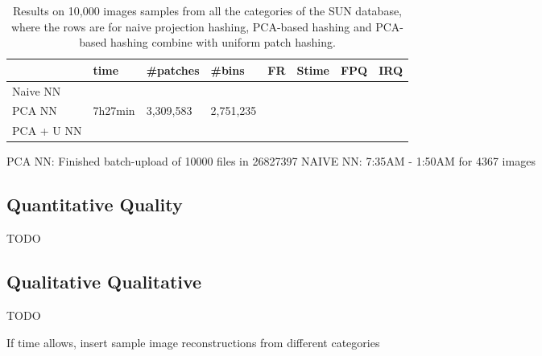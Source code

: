 \begin{table*}
\begin{tabular}{ | l | l | l | l | l | l | l | l | }
\hline
& time & \#patches & \#bins & FR & Stime & FPQ & IRQ \\
\hline
Naive NN & & & & & & & \\
PCA NN & 7h27min & 3,309,583 & 2,751,235 & & & &  \\
PCA + U NN & & & & & & &\\
\hline
\end{tabular}
\caption{Results on 10,000 images samples from all
the categories of the SUN database, where the rows
are for naive projection hashing, PCA-based hashing and
PCA-based hashing combine with uniform patch hashing.}
\label{tb:nn-res}
\end{table*}

PCA NN: Finished batch-upload of 10000 files in 26827397
NAIVE NN: 7:35AM - 1:50AM for 4367 images



\subsection{Quantitative Quality}\label{ssec:quant}
\begin{edit}
TODO
\end{edit}


\subsection{Qualitative Qualitative}\label{ssec:qual}
\begin{edit}
TODO
\end{edit}

\begin{edit}
If time allows, insert sample image reconstructions from different categories
\end{edit}
